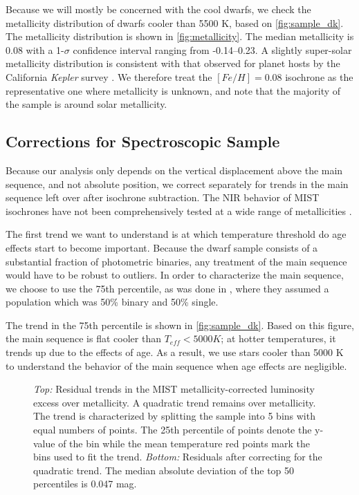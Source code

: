 \documentclass[manuscript]{aastex6}
\newcommand{\Kepler}{\mbox{\textit{Kepler}}}
\newcommand{\Teff}{\ensuremath{T_{eff}}}
\begin{document}
Because we will mostly be concerned with the cool dwarfs, we check the
metallicity distribution of dwarfs cooler than 5500 K, based on 
\cref{fig:sample_dk}. The metallicity distribution is shown in
\cref{fig:metallicity}. The median metallicity is 0.08 with a 1-\(\sigma\)
confidence interval ranging from -0.14--0.23. A slightly super-solar
metallicity distribution is consistent with that observed for planet hosts by 
the California \Kepler{} survey \citep{Petigura17}.  We therefore treat the \([Fe/H] =
0.08\) isochrone as the representative one where metallicity is unknown, and
note that the majority of the sample is around solar metallicity.

\subsection{Corrections for Spectroscopic Sample}

Because our analysis only depends on the vertical displacement above the main
sequence, and not absolute position, we correct separately for trends in the
main sequence left over after isochrone subtraction. The NIR behavior of MIST 
isochrones have not been comprehensively tested at a wide range of 
metallicities \citep{Choi16}.

The first trend we want to understand is at which temperature threshold do age
effects start to become important. Because the dwarf sample consists of a
substantial fraction of photometric binaries, any treatment of the main
sequence would have to be robust to outliers. In order to characterize the main
sequence, we choose to use the 75th percentile, as was done in
\citep{Mermilliod92}, where they assumed a population which was 50\% binary and
50\% single. 

The trend in the 75th percentile is shown in \cref{fig:sample_dk}. Based on 
this figure, the main sequence is flat cooler than \(\Teff < 5000 K\); at
hotter temperatures, it trends up due to the effects of age. As a result, we 
use stars cooler than 5000 K to understand the behavior of the main sequence 
when age effects are negligible.

\begin{figure}[htb]
    \centering
    \caption{\emph{Top:} Residual trends in the MIST metallicity-corrected luminosity 
    excess over metallicity. A quadratic trend remains over metallicity. The
    trend is characterized by splitting the sample into 5 bins with equal
    numbers of points.  The 25th percentile of points denote the y-value of the
    bin while the mean temperature red points mark the bins used to fit the trend. \emph{Bottom:} Residuals after
correcting for the quadratic trend. The median absolute deviation of the top 50
percentiles is 0.047 mag.}
    \label{fig:met_trend}
\end{figure}
\end{document}
